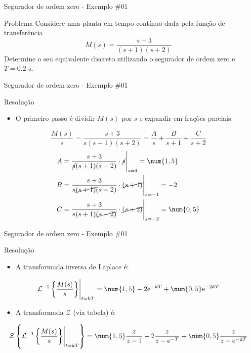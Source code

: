 \begin{frame}{Segurador de ordem zero - Exemplo \#01}
\begin{block}{Problema}
Considere uma planta em tempo contínuo dada pela função de transferência
$$M(s) = \dfrac{s+3}{(s+1)(s+2)}$$
Determine o seu equivalente discreto utilizando o segurador de ordem zero e $T=\num{0,2}$ s.
\end{block}
\end{frame}

\begin{frame}{Segurador de ordem zero - Exemplo \#01}
\begin{block}{Resolução}
\begin{itemize}
    \item O primeiro passo é dividir $M(s)$ por $s$ e expandir em frações parciais:
\end{itemize}
$$\dfrac{M(s)}{s}=\dfrac{s+3}{s(s+1)(s+2)}=\dfrac{A}{s}+\dfrac{B}{s+1}+\dfrac{C}{s+2}$$
\begin{align*}
A&=\eval{\dfrac{s+3}{\cancel{s}(s+1)(s+2)}\cdot \cancel{s}}_{s=0}=\num{1,5} \\ B&=\eval{\dfrac{s+3}{s\cancel{(s+1)}(s+2)}\cdot\cancel{(s+1)}}_{s=-1}=-2 \\
C&=\eval{\dfrac{s+3}{s(s+1)\cancel{(s+2)}}\cdot\cancel{(s+2)}}_{s=-2}=\num{0,5}
\end{align*}
\end{block}
\end{frame}

\begin{frame}{Segurador de ordem zero - Exemplo \#01}
\begin{block}{Resolução}
\begin{itemize}
    \item A transformada inversa de Laplace é:
\end{itemize}
$$\eval{\mathcal{L}^{-1}\left\lbrace \dfrac{M(s)}{s} \right\rbrace}_{t=kT} = \num{1,5}-2\text{e}^{-kT}+\num{0,5}\text{e}^{-2kT}$$
\begin{itemize}
    \item A transformada $\mathcal{Z}$ (via tabela) é:
\end{itemize}
$$\mathcal{Z}\left\lbrace \eval{\mathcal{L}^{-1}\left\lbrace \dfrac{M(s)}{s} \right\rbrace}_{t=kT}\right\rbrace = \num{1,5}\dfrac{z}{z-1} -2\dfrac{z}{z-\text{e}^{-T}}+\num{0,5}\dfrac{z}{z-\text{e}^{-2T}}$$
\end{block}
\end{frame}

